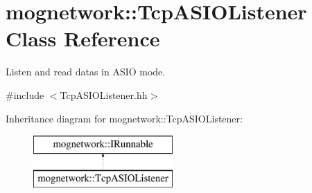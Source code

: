 \hypertarget{classmognetwork_1_1_tcp_a_s_i_o_listener}{\section{mognetwork\-:\-:Tcp\-A\-S\-I\-O\-Listener Class Reference}
\label{classmognetwork_1_1_tcp_a_s_i_o_listener}
}


Listen and read datas in A\-S\-I\-O mode.  




{\ttfamily \#include $<$Tcp\-A\-S\-I\-O\-Listener.\-hh$>$}

Inheritance diagram for mognetwork\-:\-:Tcp\-A\-S\-I\-O\-Listener\-:\begin{figure}[H]
\begin{center}
\leavevmode
\includegraphics[height=2.000000cm]{classmognetwork_1_1_tcp_a_s_i_o_listener}
\end{center}
\end{figure}
